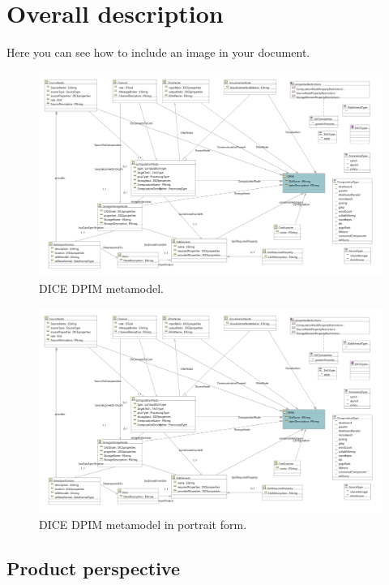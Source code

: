 \section{Overall description}
\label{sect:overalldescription}

Here you can see how to include an image in your document.

\begin{figure}
\centering
\includegraphics[width=\textwidth]{Images/11.png}
\caption{\label{fig:metamodel}DICE DPIM metamodel.}
\end{figure}

\begin{figure}
\centering
\includegraphics[width=\textwidth]{Images/11.png}
\caption{\label{fig:metamodel2}DICE DPIM metamodel in portrait form.}
\end{figure}

\subsection{Product perspective}
\label{subsect:productperspective}

